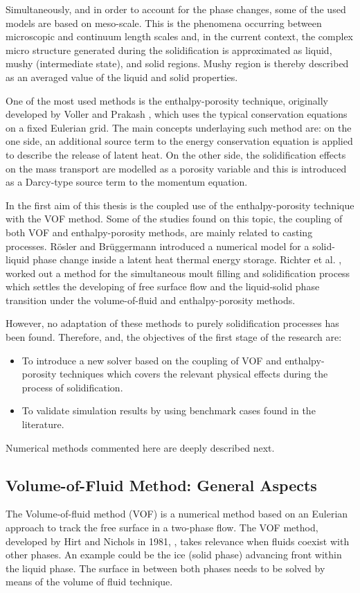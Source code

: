 \noindent Simultaneously, and in order to account for the phase changes, some of the used models are based on meso-scale. This is the phenomena occurring between microscopic and continuum length scales and, in the current context, the complex micro structure generated during the solidification is approximated as liquid, mushy (intermediate state), and solid regions. Mushy region is thereby described as an averaged value of the liquid and solid properties.

\noindent One of the most used methods is the enthalpy-porosity technique, originally developed by Voller and Prakash \cite{voller_prakash_1987}, which uses the typical conservation equations on a fixed Eulerian grid. The main concepts underlaying such method are: on the one side, an additional source term to the energy conservation equation is applied to describe the release of latent heat. On the other side, the solidification effects on the mass transport are modelled as a porosity variable and this is introduced as a Darcy-type source term to the momentum equation.


\noindent In the first aim of this thesis is the coupled use of the enthalpy-porosity technique with the VOF method. Some of the studies found on this topic, the coupling of both VOF and enthalpy-porosity methods, are mainly related to casting processes. Rösler and Brüggermann \cite{rösler_brüggemann_2011} introduced a numerical model for a solid-liquid phase change inside a latent heat thermal energy storage. Richter et al. \cite{richter_turnow_kornev_hassel_2016}, worked out a method for the simultaneous moult filling and solidification process which settles the developing of free surface flow and the liquid-solid phase transition under the volume-of-fluid and enthalpy-porosity methods.

\noindent However, no adaptation of these methods to purely solidification processes has been found. Therefore, and, the objectives of the first stage of the research are:
\begin{itemize}
	\item To introduce a new solver based on the coupling of VOF and enthalpy-porosity techniques which covers the relevant physical effects during the process of solidification.
	\item	To validate simulation results by using benchmark cases found in the literature.
\end{itemize}
Numerical methods commented here are deeply described next.

\subsection{Volume-of-Fluid Method: General Aspects}
\setlength{\parindent}{0.5cm} The Volume-of-fluid method (VOF) is a numerical method based on an Eulerian approach to track the free surface in a two-phase flow.
The VOF method, developed by Hirt and Nichols in 1981, \cite{hirt_nichols_1981}, takes relevance when fluids coexist with other phases. An example could be the ice (solid phase) advancing front within the liquid phase. The surface in between both phases needs to be solved by means of the volume of fluid technique.


